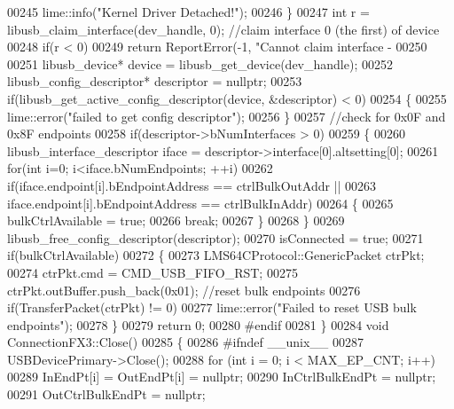 \begin{DoxyCode}
{00245             lime::info(\textcolor{stringliteral}{"Kernel Driver Detached!"});
00246     \}
00247     \textcolor{keywordtype}{int} r = libusb\_claim\_interface(dev\_handle, 0); \textcolor{comment}{//claim interface 0 (the first) of device}
00248     \textcolor{keywordflow}{if}(r < 0)
00249         \textcolor{keywordflow}{return} ReportError(-1, \textcolor{stringliteral}{"Cannot claim interface - %
00250 
00251     libusb\_device* device = libusb\_get\_device(dev\_handle);
00252     libusb\_config\_descriptor* descriptor = \textcolor{keyword}{nullptr};
00253     \textcolor{keywordflow}{if}(libusb\_get\_active\_config\_descriptor(device, &descriptor) < 0)
00254     \{
00255         lime::error(\textcolor{stringliteral}{"failed to get config descriptor"});
00256     \}
00257     \textcolor{comment}{//check for 0x0F and 0x8F endpoints}
00258     \textcolor{keywordflow}{if}(descriptor->bNumInterfaces > 0)
00259     \{
00260         libusb\_interface\_descriptor iface = descriptor->interface[0].altsetting[0];
00261         \textcolor{keywordflow}{for}(\textcolor{keywordtype}{int} i=0; i<iface.bNumEndpoints; ++i)
00262             \textcolor{keywordflow}{if}(iface.endpoint[i].bEndpointAddress == ctrlBulkOutAddr ||
00263                iface.endpoint[i].bEndpointAddress == ctrlBulkInAddr)
00264             \{
00265                 bulkCtrlAvailable = \textcolor{keyword}{true};
00266                 \textcolor{keywordflow}{break};
00267             \}
00268     \}
00269     libusb\_free\_config\_descriptor(descriptor);
00270     isConnected = \textcolor{keyword}{true};
00271     \textcolor{keywordflow}{if}(bulkCtrlAvailable)
00272     \{
00273         LMS64CProtocol::GenericPacket ctrPkt;
00274         ctrPkt.cmd = CMD_USB_FIFO_RST;
00275         ctrPkt.outBuffer.push\_back(0x01); \textcolor{comment}{//reset bulk endpoints}
00276         \textcolor{keywordflow}{if}(TransferPacket(ctrPkt) != 0)
00277             lime::error(\textcolor{stringliteral}{"Failed to reset USB bulk endpoints"});
00278     \}
00279     \textcolor{keywordflow}{return} 0;
00280 \textcolor{preprocessor}{#endif}
00281 \}
00284 \textcolor{keywordtype}{void} ConnectionFX3::Close()
00285 \{
00286 \textcolor{preprocessor}{    #ifndef \_\_unix\_\_}
00287     USBDevicePrimary->Close();
00288     \textcolor{keywordflow}{for} (\textcolor{keywordtype}{int} i = 0; i < MAX\_EP\_CNT; i++)
00289         InEndPt[i] = OutEndPt[i] = \textcolor{keyword}{nullptr};
00290     InCtrlBulkEndPt = \textcolor{keyword}{nullptr};
00291     OutCtrlBulkEndPt = \textcolor{keyword}{nullptr};
}}
\end{DoxyCode}
